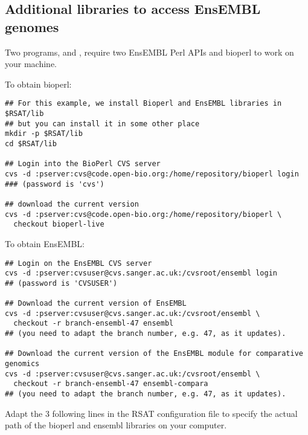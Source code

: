 \documentclass{book}
\begin{document}
\subsection{Additional libraries to access EnsEMBL genomes}

Two programs,  and
, require two EnsEMBL Perl APIs and
bioperl to work on your machine.

To obtain bioperl:

\begin{footnotesize}
\begin{verbatim}
## For this example, we install Bioperl and EnsEMBL libraries in $RSAT/lib
## but you can install it in some other place
mkdir -p $RSAT/lib
cd $RSAT/lib

## Login into the BioPerl CVS server
cvs -d :pserver:cvs@code.open-bio.org:/home/repository/bioperl login
### (password is 'cvs')

## download the current version
cvs -d :pserver:cvs@code.open-bio.org:/home/repository/bioperl \
  checkout bioperl-live

\end{verbatim}
\end{footnotesize}


To obtain EnsEMBL:

\begin{footnotesize}
\begin{verbatim}
## Login on the EnsEMBL CVS server
cvs -d :pserver:cvsuser@cvs.sanger.ac.uk:/cvsroot/ensembl login
## (password is 'CVSUSER')

## Download the current version of EnsEMBL
cvs -d :pserver:cvsuser@cvs.sanger.ac.uk:/cvsroot/ensembl \
  checkout -r branch-ensembl-47 ensembl
## (you need to adapt the branch number, e.g. 47, as it updates).

## Download the current version of the EnsEMBL module for comparative genomics
cvs -d :pserver:cvsuser@cvs.sanger.ac.uk:/cvsroot/ensembl \
  checkout -r branch-ensembl-47 ensembl-compara
## (you need to adapt the branch number, e.g. 47, as it updates).
\end{verbatim}
\end{footnotesize}

Adapt the 3 following lines in the RSAT configuration file
 to specify the actual path of the bioperl
and ensembl libraries on your computer.
\end{document}
